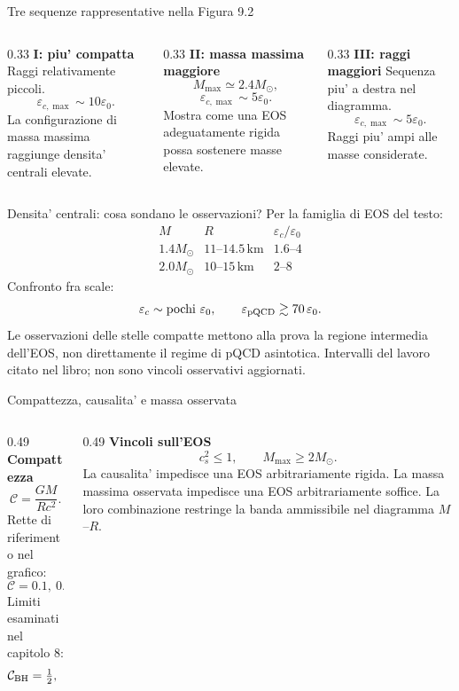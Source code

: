 \begin{frame}{Tre sequenze rappresentative nella Figura 9.2}
\footnotesize
\begin{columns}[T,onlytextwidth]
\begin{column}{0.33\textwidth}
\textbf{I: piu' compatta}
\medskip
Raggi relativamente piccoli.
\[
\varepsilon_{c,\max}\sim10\varepsilon_0.
\]
La configurazione di massa massima raggiunge densita' centrali elevate.
\end{column}
\begin{column}{0.33\textwidth}
\textbf{II: massa massima maggiore}
\[
M_{\max}\simeq2.4M_\odot,
\]
\[
\varepsilon_{c,\max}\sim5\varepsilon_0.
\]
Mostra come una EOS adeguatamente rigida possa sostenere masse elevate.
\end{column}
\begin{column}{0.33\textwidth}
\textbf{III: raggi maggiori}
\medskip
Sequenza piu' a destra nel diagramma.
\[
\varepsilon_{c,\max}\sim5\varepsilon_0.
\]
Raggi piu' ampi alle masse considerate.
\end{column}
\end{columns}
\end{frame}

\begin{frame}{Densita' centrali: cosa sondano le osservazioni?}
\small
Per la famiglia di EOS del testo:
\[
\begin{array}{c|c|c}
M & R & \varepsilon_c/\varepsilon_0\\ \hline
1.4M_\odot & 11\text{--}14.5\,\mathrm{km} & 1.6\text{--}4\\[1mm]
2.0M_\odot & 10\text{--}15\,\mathrm{km} & 2\text{--}8
\end{array}
\]
Confronto fra scale:
\[
\varepsilon_c\sim\text{pochi }\varepsilon_0,
\qquad \varepsilon_{\rm pQCD}\gtrsim70\,\varepsilon_0.
\]
Le osservazioni delle stelle compatte mettono alla prova la regione intermedia dell'EOS, non direttamente il regime di pQCD asintotica.
\medskip
{\scriptsize Intervalli del lavoro citato nel libro; non sono vincoli osservativi aggiornati.}
\end{frame}

\begin{frame}{Compattezza, causalita' e massa osservata}
\small
\begin{columns}[T,onlytextwidth]
\begin{column}{0.49\textwidth}
\textbf{Compattezza}
\[
\mathcal C=\frac{GM}{Rc^2}.
\]
Rette di riferimento nel grafico:
\[
\mathcal C=0.1,\ 0.2,\ 0.3.
\]
Limiti esaminati nel capitolo 8:
\[
\mathcal C_{\rm BH}=\tfrac12,\quad
\mathcal C_{\rm Buchdahl}=\tfrac49.
\]
\end{column}
\begin{column}{0.49\textwidth}
\textbf{Vincoli sull'EOS}
\[
c_s^2\leq1,\qquad M_{\max}\geq2M_\odot.
\]
La causalita' impedisce una EOS arbitrariamente rigida.
\medskip
La massa massima osservata impedisce una EOS arbitrariamente soffice.
\medskip
La loro combinazione restringe la banda ammissibile nel diagramma $M$--$R$.
\end{column}
\end{columns}
\end{frame}

